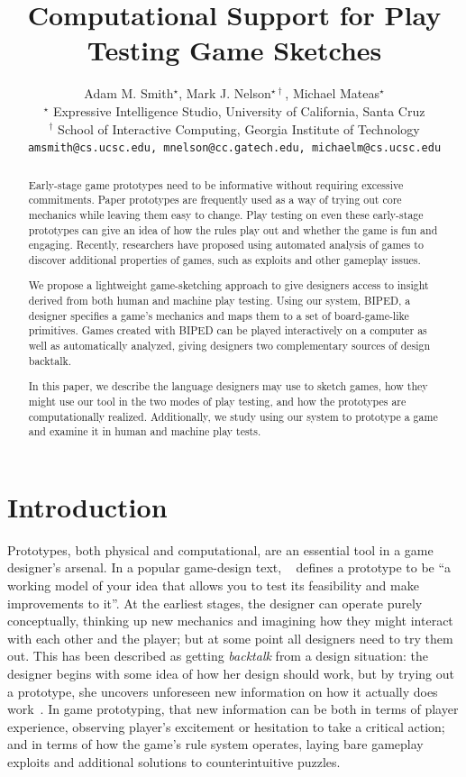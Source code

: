 \documentclass[letterpaper]{article}
\title{Computational Support for Play Testing Game Sketches}
\author{Adam M. Smith$^\star$, Mark J. Nelson$^{\star\dagger}$, Michael Mateas$^\star$\\
$^\star$ Expressive Intelligence Studio, University of California, Santa Cruz\\
$^\dagger$ School of Interactive Computing, Georgia Institute of Technology\\
\texttt{amsmith@cs.ucsc.edu, mnelson@cc.gatech.edu, michaelm@cs.ucsc.edu}
}
\newcommand{\citenoun}[1]{\citeauthor{#1}~\shortcite{#1}}
\begin{document}
\maketitle

\begin{abstract}

Early-stage game prototypes need to be informative without requiring excessive
commitments. Paper prototypes are frequently used as a way of trying out core
mechanics while leaving them easy to change. Play testing on even these
early-stage prototypes can give an idea of how the rules play out and whether
the game is fun and engaging.  Recently, researchers have proposed using
automated analysis of games to discover additional properties of games, such as
exploits and other gameplay issues.

We propose a lightweight game-sketching approach to give designers access to
insight derived from both human and machine play testing. Using our system,
BIPED, a designer specifies a game's mechanics and maps them to a set of
board-game-like primitives. Games created with BIPED can be played
interactively on a computer as well as automatically analyzed, giving designers
two complementary sources of design backtalk.

In this paper, we describe the language designers may use to sketch games,
how they might use our tool in the two modes of play testing, and how the prototypes
are computationally realized. Additionally, we study using our system to prototype
a game and examine it in human and machine play tests.

\end{abstract}

\section{Introduction}

Prototypes, both physical and computational, are an essential tool in a game
designer's arsenal. In a popular game-design text, \citenoun{Fullerton} defines
a prototype to be ``a working model of your idea that allows you to test its
feasibility and make improvements to it''. At the earliest stages, the designer
can operate purely conceptually, thinking up new mechanics and imagining how
they might interact with each other and the player; but at some point all
designers need to try them out. This has been described as getting
\emph{backtalk} from a design situation: the designer begins with some idea of
how her design should work, but by trying out a prototype, she uncovers unforeseen
new information on how it actually does work~\cite{Schoen:book}. In game
prototyping, that new information can be both in terms of player experience,
observing player's excitement or hesitation to take a critical
action; and in terms of how the game's rule system operates, laying bare
gameplay exploits and additional solutions to counterintuitive puzzles.
\end{document}
